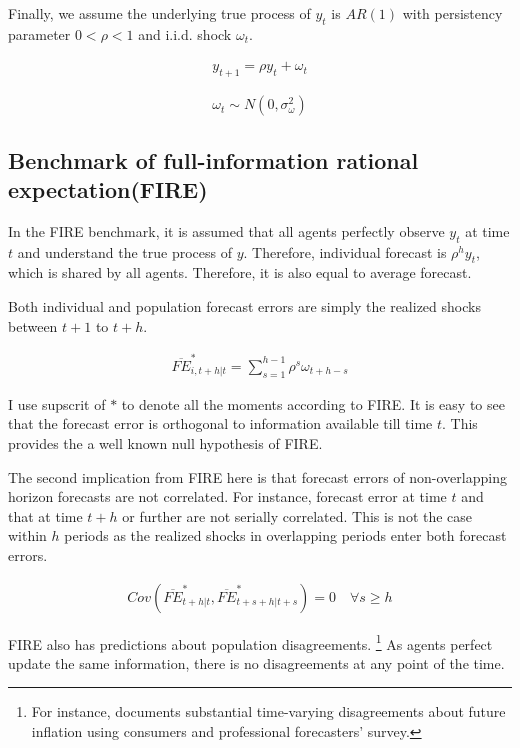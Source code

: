 \documentclass[]{article}
\begin{document}
Finally, we assume the underlying true process of $y_{t}$ is $AR(1)$ with persistency parameter $0<\rho <1$ and i.i.d. shock $\omega_t$. 

\begin{eqnarray}\label{AR_process}
	y_{t+1} = \rho y_t + \omega_t
\end{eqnarray}

$$\omega_t \sim N(0,\sigma^2_{\omega})$$

\subsection{Benchmark of full-information rational expectation(FIRE)}

 In the FIRE benchmark,  it is assumed that all agents perfectly observe $y_t$ at time $t$ and understand the true process of $y$. Therefore, individual forecast is $\rho^h y_t $, which is shared by all agents. Therefore, it is also equal to average forecast. 

Both individual and population forecast errors are simply the realized shocks between $t+1$ to $t+h$.  

\begin{eqnarray}\label{NoPastInfFE}
\overline{FE}^{*}_{i,t+h|t} = \sum^{h-1}_{s=1} \rho^s \omega_{t+h-s}
\end{eqnarray}

I use supscrit of $*$ to denote all the moments according to FIRE. It is easy to see that the forecast error is orthogonal to information available till time $t$. This provides the a well known null hypothesis of FIRE. \citet{xx}

The second implication from FIRE here is that forecast errors of non-overlapping horizon forecasts are not correlated. For instance, forecast error at time $t$ and that at time $t+h$ or further are not serially correlated. This is not the case within $h$ periods as the realized shocks in overlapping periods enter both forecast errors. 

\begin{eqnarray}\label{NoSerialCorrFE}
Cov(\overline{FE}^{*}_{t+h|t}, \overline{FE}^{*}_{t+s+h|t+s}) = 0 \quad \forall s \geq h
\end{eqnarray}

FIRE also has predictions about  population disagreements. \footnote{For instance, \citet{mankiw2003disagreement} documents substantial time-varying disagreements about future inflation using consumers and professional forecasters' survey. } As agents perfect update the same information, there is no disagreements at any point of the time. 
\end{document}
